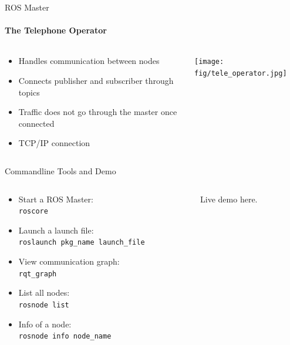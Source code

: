 \documentclass[aspectratio=43]{beamer}
\newcommand{\inline}[1]{\texttt{#1}}
\begin{document}
\begin{frame}{ROS Master}
	\framesubtitle{The Telephone Operator}
	\begin{columns}[T]
		\begin{column}{0.6\textwidth}
			\begin{itemize}
			\item<1-> Handles communication between nodes
			\item<2-> Connects publisher and subscriber through topics
			\item<3-> Traffic does \alert{not} go through the master once connected
			\item<4-> TCP/IP connection
			\end{itemize}
		\end{column}
		\begin{column}{0.4\textwidth}
			\centering
			\texttt{[image: fig/tele\_operator.jpg]}
		\end{column}
	\end{columns}
\end{frame}

\begin{frame}{Commandline Tools and Demo}
	\begin{columns}
		\begin{column}{0.5\textwidth}
			\begin{itemize}
				\item Start a ROS Master:\\\inline{roscore}
				\item Launch a launch file:\\\inline{roslaunch pkg_name launch_file}
				\item View communication graph:\\\inline{rqt_graph}
				\item List all nodes:\\\inline{rosnode list}
				\item Info of a node:\\\inline{rosnode info node_name}
			\end{itemize}
		\end{column}
		\begin{column}{0.5\textwidth}
			\centering
			Live demo here.
		\end{column}
	\end{columns}
\end{frame}
\end{document}
